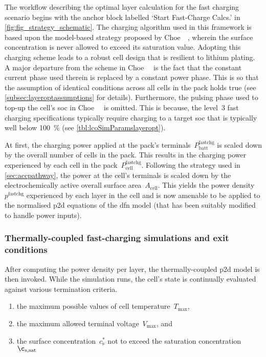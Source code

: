 The  workflow describing  the optimal  layer calculation  for the  fast charging
scenario begins  with the  anchor block labelled  `Start Fast-Charge  Calcs.' in
\cref{fig:fig_strategy_schematic}. The charging algorithm used in this framework
is based  upon the model-based strategy  proposed by Choe~\etal~\cite{Choe2013},
wherein  the surface  concentration is  never allowed  to exceed  its saturation
value.  Adopting  this charging  scheme  leads  to  a  robust cell  design  that
is  resilient  to  lithium  plating.  A  major  departure  from  the  scheme  in
Choe~\etal~\cite{Choe2013}  is the  fact that  the constant  current phase  used
therein is replaced  by a constant power  phase. This is so  that the assumption
of  identical  conditions  across  all  cells   in  the  pack  holds  true  (see
\cref{subsec:layeroptassumptions} for  details). Furthermore, the  pulsing phase
used to  top-up the cell's  \gls{soc} in Choe~\etal~\cite{Choe2013}  is omitted.
This  is because,  the level~3  fast charging  specifications typically  require
charging to a  target \gls{soc} that is typically  well below \SI{100}{\percent}
(see \cref{tbl:lcoSimParamslayeropt}).

At     first,     the    charging     power     applied     at    the     pack's
terminals~$P_\text{batt}^\text{fastchg}$ is scaled down by the overall number of
cells in the pack.  This results in the charging power  experienced by each cell
in  the  pack~$P_\text{cell}^\text{fastchg}$.  Following the  strategy  used  in
\cref{sec:accpathway}, the power  at the cell's terminals is scaled  down by the
electrochemically active  overall surface area~$A_\text{cell}$. This  yields the
power density~$p^{\text{fastchg}}$ experienced by each  layer in the cell and is
now  amenable  to be  applied  to  the  normalised  \gls{p2d} equations  of  the
\gls{dfn} model (that has been suitably modified to handle power inputs).

\subsubsection*{Thermally-coupled fast-charging simulations and exit conditions}

After computing  the power  density per  layer, the  thermally-coupled \gls{p2d}
model  is  then  invoked.  While  the  simulation  runs,  the  cell's  state  is
continually evaluated against various termination criteria.
\begin{enumerate}
    \item the maximum possible values of cell temperature~$T_\text{max}$,
    \item the maximum allowed terminal voltage~$V_\text{max}$, and
    \item the surface concentration~$c_\text{s}^{\ast}$ not to exceed the saturation concentration~$\c_\text{s,sat}$
\end{enumerate}


